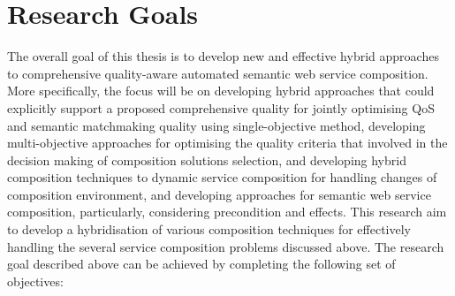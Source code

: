 \section{Research Goals}
The overall goal of this thesis is to develop new and effective hybrid approaches to comprehensive quality-aware automated semantic web service composition. More specifically, the focus will be on developing hybrid approaches that could explicitly support a proposed comprehensive quality for jointly optimising QoS and semantic matchmaking quality using single-objective method, developing multi-objective approaches for optimising the quality criteria that involved in the decision making of composition solutions selection, and developing hybrid composition techniques to dynamic service composition for handling changes of composition environment, and developing approaches for semantic web service composition, particularly, considering precondition and effects. This research aim to develop a hybridisation of various composition techniques for effectively handling the several service composition problems discussed above. The research goal described above can be achieved by completing the following set of objectives:


